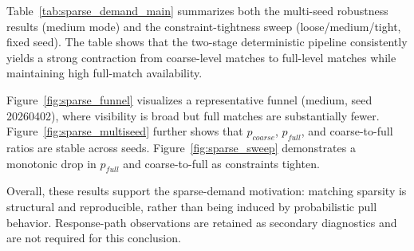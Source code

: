 Table~\ref{tab:sparse_demand_main} summarizes both the multi-seed robustness results (medium mode) and the constraint-tightness sweep (loose/medium/tight, fixed seed). The table shows that the two-stage deterministic pipeline consistently yields a strong contraction from coarse-level matches to full-level matches while maintaining high full-match availability.

Figure~\ref{fig:sparse_funnel} visualizes a representative funnel (medium, seed 20260402), where visibility is broad but full matches are substantially fewer. Figure~\ref{fig:sparse_multiseed} further shows that $p_{coarse}$, $p_{full}$, and coarse-to-full ratios are stable across seeds. Figure~\ref{fig:sparse_sweep} demonstrates a monotonic drop in $p_{full}$ and coarse-to-full as constraints tighten.

Overall, these results support the sparse-demand motivation: matching sparsity is structural and reproducible, rather than being induced by probabilistic pull behavior. Response-path observations are retained as secondary diagnostics and are not required for this conclusion.
